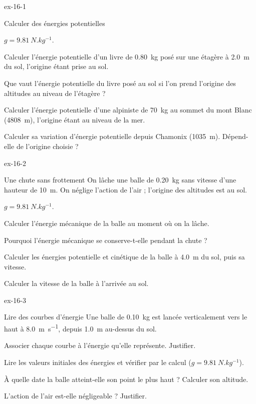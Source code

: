 \begin{blocLivre}{ex-16-1}
\begin{exercice}[1]{Calculer des énergies potentielles}
\begin{donnees}
$g=\qty{9,81}{N.kg^{-1}}$.
\end{donnees}
\begin{questions}
\item Calculer l'énergie potentielle d'un livre de \qty{0,80}{kg} posé sur une étagère à \qty{2,0}{m} du sol, l'origine étant prise au sol.
\item Que vaut l'énergie potentielle du livre posé au sol si l'on prend l'origine des altitudes au niveau de l'étagère ?
\item Calculer l'énergie potentielle d'une alpiniste de \qty{70}{kg} au sommet du mont Blanc (\qty{4808}{m}), l'origine étant au niveau de la mer.
\item Calculer sa variation d'énergie potentielle depuis Chamonix (\qty{1035}{m}). Dépend-elle de l'origine choisie ?
\end{questions}
\end{exercice}
\end{blocLivre}
\begin{blocLivre}{ex-16-2}
\begin{exercice}[1]{Une chute sans frottement}
On lâche une balle de \qty{0,20}{kg} sans vitesse d'une hauteur de \qty{10}{m}. On néglige l'action de l'air ; l'origine des altitudes est au sol.
\begin{donnees}
$g=\qty{9,81}{N.kg^{-1}}$.
\end{donnees}
\begin{questions}
\item Calculer l'énergie mécanique de la balle au moment où on la lâche.
\item Pourquoi l'énergie mécanique se conserve-t-elle pendant la chute ?
\item Calculer les énergies potentielle et cinétique de la balle à \qty{4,0}{m} du sol, puis sa vitesse.
\item Calculer la vitesse de la balle à l'arrivée au sol.
\end{questions}
\end{exercice}
\end{blocLivre}
\begin{blocLivre}{ex-16-3}
\begin{exercice}[1]{Lire des courbes d'énergie}
Une balle de \qty{0,10}{kg} est lancée verticalement vers le haut à \qty{8,0}{m.s^{-1}}, depuis \qty{1,0}{m} au-dessus du sol.
\begin{questions}
\item Associer chaque courbe à l'énergie qu'elle représente. Justifier.
\item Lire les valeurs initiales des énergies et vérifier par le calcul ($g=\qty{9,81}{N.kg^{-1}}$).
\item À quelle date la balle atteint-elle son point le plus haut ? Calculer son altitude.
\item L'action de l'air est-elle négligeable ? Justifier.
\end{questions}
\end{exercice}
\end{blocLivre}
